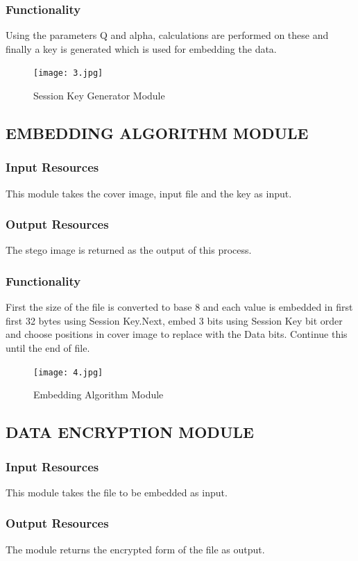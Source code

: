 \documentclass[12pt]{report}
\begin{document}
\subsubsection{Functionality}
Using the parameters Q and alpha, calculations are performed on these and finally a key is generated which is used for embedding the data.
\begin{figure}[h!]
	\centering
		\texttt{[image: 3.jpg]}
		\caption{Session Key Generator Module}
\end{figure} 
\pagebreak
\subsection{EMBEDDING ALGORITHM MODULE}
\subsubsection{Input Resources}
This module takes the cover image, input file and the key as input.
\subsubsection{Output Resources}
The stego image is returned as the output of this process.
\subsubsection{Functionality}
First the size of the file is converted to base 8 and each value is embedded in first first 32 bytes using Session Key.Next,  embed 3 bits using Session Key bit order and choose positions in cover image to replace with the Data bits. Continue this until the end of file.
\begin{figure}[h!]
	\centering
		\texttt{[image: 4.jpg]}
		\caption{Embedding Algorithm Module}
\end{figure} 
\pagebreak
\subsection{DATA ENCRYPTION MODULE}
\subsubsection{Input Resources}
This module takes the file to be embedded as input.
\subsubsection{Output Resources}
The module returns the encrypted form of the file as output.
\end{document}
